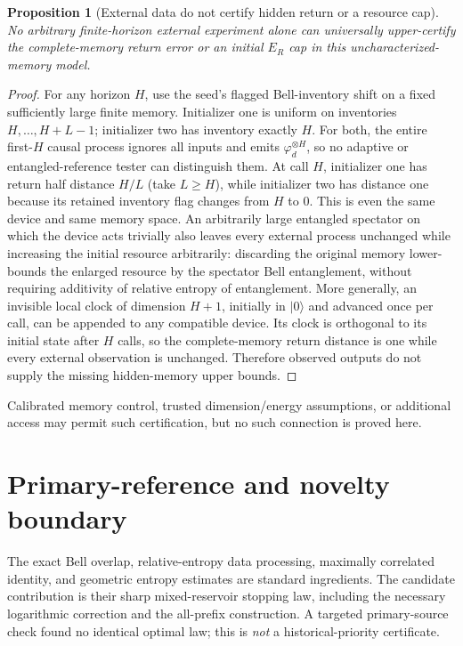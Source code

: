 \documentclass[11pt,a4paper]{article}
\newtheorem{proposition}[theorem]{Proposition}
\newcommand{\ER}{E_R}
\newcommand{\ph}{\varphi}
\begin{document}
\begin{proposition}[External data do not certify hidden return or a resource cap]
No arbitrary finite-horizon external experiment alone can universally
upper-certify the complete-memory return error or an initial \(\ER\) cap
in this uncharacterized-memory model.
\end{proposition}
\begin{proof}
For any horizon \(H\), use the seed's flagged Bell-inventory shift on a fixed
sufficiently large finite memory. Initializer one is uniform on inventories
\(H,\ldots,H+L-1\); initializer two has inventory exactly \(H\).
For both, the entire first-\(H\) causal process ignores all inputs and emits
\(\ph_d^{\otimes H}\), so no adaptive or entangled-reference tester can
distinguish them. At call \(H\), initializer one has return half distance
\(H/L\) (take \(L\ge H\)), while initializer two has distance one because
its retained inventory flag changes from \(H\) to \(0\).
This is even the same device and same memory space.
An arbitrarily large entangled spectator on which the device acts trivially
also leaves every external process unchanged while increasing the initial
resource arbitrarily: discarding the original memory lower-bounds the enlarged
resource by the spectator Bell entanglement, without requiring additivity of
relative entropy of entanglement. More generally, an invisible local clock
of dimension \(H+1\), initially in \(|0\rangle\) and advanced once per call,
can be appended to any compatible device. Its clock is orthogonal to its initial
state after \(H\) calls, so the complete-memory return distance is one while
every external observation is unchanged. Therefore observed outputs do not
supply the missing hidden-memory upper bounds.
\end{proof}
Calibrated memory control, trusted dimension/energy assumptions, or additional
access may permit such certification, but no such connection is proved here.

\section{Primary-reference and novelty boundary}
The exact Bell overlap, relative-entropy data processing, maximally correlated
identity, and geometric entropy estimates are standard ingredients.
The candidate contribution is their sharp mixed-reservoir stopping law,
including the necessary logarithmic correction and the all-prefix construction.
A targeted primary-source check found no identical optimal law; this is
\emph{not} a historical-priority certificate.
\end{document}
